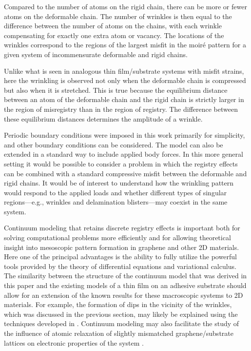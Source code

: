 \documentclass{siamltex}
\begin{document}
  {Compared to the number of atoms on the rigid chain, there can
  be more or fewer atoms on the deformable chain. The number of
  wrinkles is then equal to the difference between the number of atoms on the chains, with each wrinkle compensating for exactly one extra
  atom or vacancy. The locations of the wrinkles correspond to the
  regions of the largest misfit in the moir\'e pattern for a given
  system of incommensurate deformable and rigid chains.   }
  
 {Unlike what is seen in
  analogous thin film/substrate systems with misfit strains, here the wrinkling is
  observed not only when the deformable chain is compressed but also when it is stretched. This is true because the equilibrium distance between an atom of the deformable chain and the rigid chain is strictly larger in the region of misregistry than in the region of registry. The difference between these equilibrium distances determines the amplitude of a wrinkle.}

{Periodic boundary conditions were imposed in this work primarily
  for simplicity, and other boundary conditions can be considered. The
  model can also be extended in a standard way to include applied body
  forces. In this more general setting it would be possible to consider a problem in which the registry effects can be combined with a standard compressive misfit between the deformable and rigid chains. It would be of interest to understand how the wrinkling pattern would respond to the applied loads and whether different types of singular regions---e.g., wrinkles and delamination blisters---may coexist in the same system.}

{Continuum modeling that retains discrete registry effects is important both for solving computational problems more efficiently and for allowing theoretical insight into mesoscopic pattern formation in graphene and other 2D materials. Here one of the principal advantages is the ability to fully utilize the powerful tools provided by the theory of differential equations and variational calculus. The similarity between the structure of the continuum model that was derived in this paper and the existing models of a thin film on an adhesive substrate should allow for an extension of the known results for these macroscopic systems to 2D materials. For example, the formation of dips in the vicinity of the wrinkles, which was discussed in the previous section, may likely be explained using the techniques developed in \cite{PhysRevLett.107.044301}. Continuum modeling may also facilitate the study of the influence of atomic relaxation of slightly mismatched graphene/substrate lattices on electronic properties of the system \cite{van2015relaxation}.}
\end{document}

